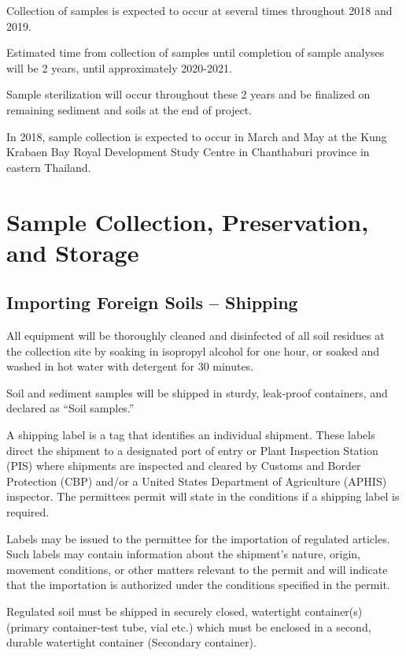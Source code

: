 \documentclass[12pt]{../SOP3}\usepackage[]{graphicx}\usepackage[]{color}
\begin{document}
\NP Collection of samples is expected to occur at several times throughout 2018 and 2019. 

\NP Estimated time from collection of samples until completion of sample analyses will be 2 years, until approximately 2020-2021. 

\NP Sample sterilization will occur throughout these 2 years and be finalized on remaining sediment and soils at the end of project. 

\NP In 2018, sample collection is expected to occur in March and May at the Kung Krabaen Bay Royal Development Study Centre in Chanthaburi province in eastern Thailand.

\section{Sample Collection, Preservation, and Storage}

\subsection{Importing Foreign Soils -- Shipping}

\NP All equipment will be thoroughly cleaned and disinfected of all soil residues at the collection site by soaking in isopropyl alcohol for one hour, or soaked and washed in hot water with detergent for 30 minutes. 

\NP Soil and sediment samples will be shipped in sturdy, leak-proof containers, and declared as ``Soil samples.'' 

\NP A shipping label is a tag that identifies an individual shipment. These labels direct the shipment to a designated port of entry or Plant Inspection Station (PIS) where shipments are inspected and cleared by Customs and Border Protection (CBP) and/or a United States Department of Agriculture (APHIS) inspector. The permittees permit will state in the conditions if a shipping label is required.

\NP Labels may be issued to the permittee for the importation of regulated articles. Such labels may contain information about the shipment's nature, origin, movement conditions, or other matters relevant to the permit and will indicate that the importation is authorized under the conditions specified in the permit.

\NP Regulated soil must be shipped in securely closed, watertight container(s) (primary container-test tube, vial etc.) which must be enclosed in a second, durable watertight container (Secondary container). 
\end{document}
